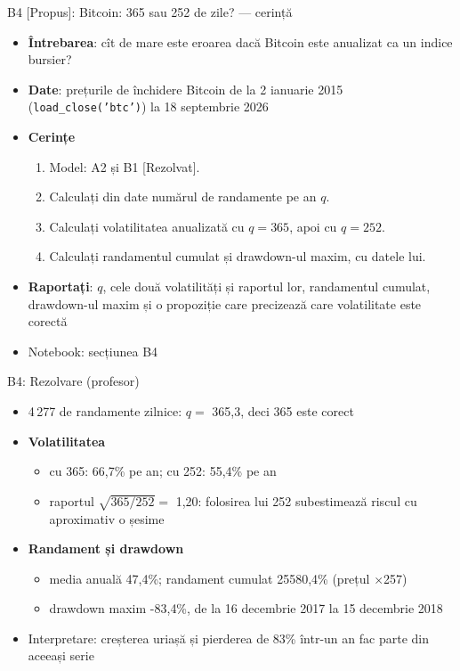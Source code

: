 \begin{frame}{B4 [Propus]: Bitcoin: 365 sau 252 de zile? --- cerință}
\itemsize{\small}
\begin{itemize}
\item \textbf{Întrebarea}: cît de mare este eroarea dacă Bitcoin este anualizat ca un indice bursier?
\item \textbf{Date}: prețurile de închidere Bitcoin de la 2 ianuarie 2015 (\texttt{load\_close('btc')}) la 18 septembrie 2026
\item \textbf{Cerințe}
\begin{enumerate}
    \item Model: A2 și B1 [Rezolvat].
    \item Calculați din date numărul de randamente pe an $q$.
    \item Calculați volatilitatea anualizată cu $q = 365$, apoi cu $q = 252$.
    \item Calculați randamentul cumulat și drawdown-ul maxim, cu datele lui.
\end{enumerate}
\item \textbf{Raportați}: $q$, cele două volatilități și raportul lor, randamentul cumulat, drawdown-ul maxim și o propoziție care precizează care volatilitate este corectă
\item Notebook: secțiunea B4
\end{itemize}
\end{frame}

\ifsolutions
\begin{frame}{B4: Rezolvare (profesor)}
\itemsize{\small}
\begin{itemize}
    \item 4\,277 de randamente zilnice: $q = $ 365{,}3, deci 365 este corect
    \item \textbf{Volatilitatea}
    \begin{itemize}
        \item cu 365: 66{,}7\% pe an; cu 252: 55{,}4\% pe an
        \item raportul $\sqrt{365/252} = $ 1{,}20: folosirea lui 252 subestimează riscul cu aproximativ o șesime
    \end{itemize}
    \item \textbf{Randament și drawdown}
    \begin{itemize}
        \item media anuală 47{,}4\%; randament cumulat 25580{,}4\% (prețul $\times$257)
        \item drawdown maxim -83{,}4\%, de la 16 decembrie 2017 la 15 decembrie 2018
    \end{itemize}
    \item Interpretare: creșterea uriașă și pierderea de 83\% într-un an fac parte din aceeași serie
\end{itemize}
\end{frame}
\fi


